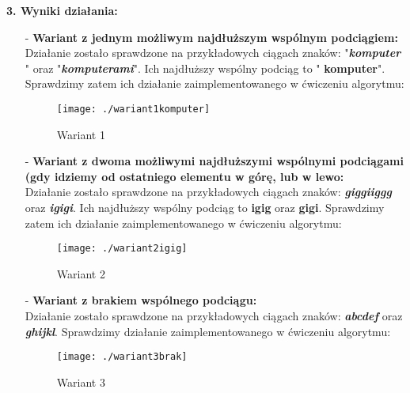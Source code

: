 \documentclass[12pt,a4paper,titlepage]{article}
\begin{document}
\newpage
	\begin{large}
	\textbf{3. Wyniki działania: }\\
	\newline
	\end{large}
	\begin{itemize}
	\item[-] \textbf{Wariant z jednym możliwym najdłuższym wspólnym podciągiem:}
	\\
	\newline
	\hspace{5pt} Działanie zostało sprawdzone na przykładowych ciągach znaków: "\textit{\textbf{komputer}} " oraz "\textit{\textbf{komputerami}}". Ich najdłuższy wspólny podciąg to "\textbf{\color{red} komputer}". Sprawdzimy zatem ich działanie zaimplementowanego w ćwiczeniu algorytmu:
	\begin{figure}[H]
\centering
\texttt{[image: ./wariant1komputer]}
\caption{Wariant 1}
\label{Wariant 1}
\end{figure}
	\newpage
	
	\item[-] \textbf{Wariant z dwoma możliwymi najdłuższymi wspólnymi podciągami (gdy idziemy od ostatniego elementu w górę, lub w lewo:}\\
	\newline
\hspace{5pt} Działanie zostało sprawdzone na przykładowych ciągach znaków: \textit{\textbf{giggiiggg}} oraz \textit{\textbf{igigi}}. Ich najdłuższy wspólny podciąg to \textbf{\color{red} igig} oraz \textbf{\color{red} gigi}. Sprawdzimy zatem ich działanie zaimplementowanego w ćwiczeniu algorytmu: \\
\newline
\begin{figure}[H]
\centering
\texttt{[image: ./wariant2igig]}
\caption{Wariant 2}
\label{Wariant 2}
\end{figure}
\newpage
\item[-] \textbf{Wariant z brakiem wspólnego podciągu:}\\
\newline
\hspace{5pt} Działanie zostało sprawdzone na przykładowych ciągach znaków: \textit{\textbf{abcdef}} oraz \textit{\textbf{ghijkl}}. Sprawdzimy działanie zaimplementowanego w ćwiczeniu algorytmu:
\begin{figure}[H]
\centering
\texttt{[image: ./wariant3brak]}
\caption{Wariant 3}
\label{Wariant 3}
\end{figure}
\end{itemize}
	
\end{document}
